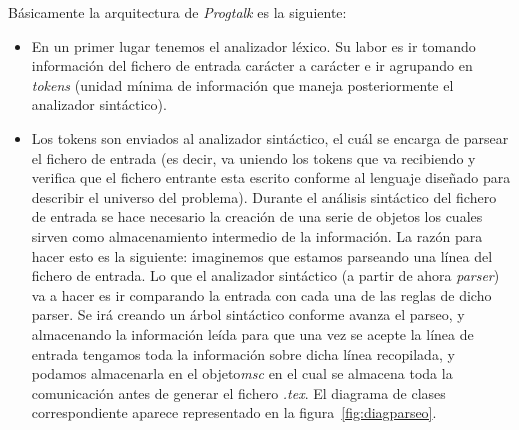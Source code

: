 Básicamente la arquitectura de \textit{Progtalk} es la siguiente:
\begin{itemize}
\item En un primer lugar tenemos el analizador léxico. Su labor es ir
  tomando información del fichero de entrada carácter a carácter e ir
  agrupando en \textit{tokens} (unidad mínima de información que
  maneja posteriormente el analizador sintáctico).
\item Los tokens son enviados al analizador sintáctico, el cuál se
  encarga de parsear el fichero de entrada (es decir, va uniendo los
  tokens que va recibiendo y verifica que el fichero entrante esta
  escrito conforme al lenguaje diseñado para describir el universo del
  problema).  Durante el análisis sintáctico del fichero de entrada se
  hace necesario la creación de una serie de objetos los cuales sirven
  como almacenamiento intermedio de la información. La razón para
  hacer esto es la siguiente: imaginemos que estamos parseando una
  línea del fichero de entrada. Lo que el analizador sintáctico (a
  partir de ahora \textit{parser}) va a hacer es ir comparando la
  entrada con cada una de las reglas de dicho parser. Se irá creando
  un árbol sintáctico conforme avanza el parseo, y almacenando la
  información leída para que una vez se acepte la línea de entrada
  tengamos toda la información sobre dicha línea recopilada, y podamos
  almacenarla en el objeto\textit{msc} en el cual se almacena toda la
  comunicación antes de generar el fichero \textit{.tex}. El diagrama
  de clases correspondiente aparece representado en la
  figura~\ref{fig:diagparseo}.


\end{itemize}
